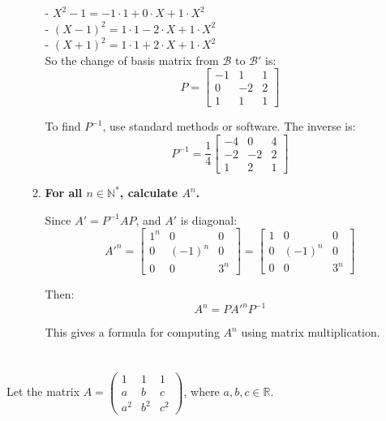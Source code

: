 \documentclass[12pt]{article}
\begin{document}
\begin{answerbox}
\begin{enumerate}
\begin{enumerate}
- $ X^2 - 1 = -1\cdot 1 + 0\cdot X + 1\cdot X^2 $ \\
- $ (X - 1)^2 = 1\cdot 1 - 2\cdot X + 1\cdot X^2 $ \\
- $ (X + 1)^2 = 1\cdot 1 + 2\cdot X + 1\cdot X^2 $ \\

So the change of basis matrix from $ \mathcal{B} $ to $ \mathcal{B}' $ is:
$$
P =
\begin{bmatrix}
-1 & 1 & 1 \\
0 & -2 & 2 \\
1 & 1 & 1
\end{bmatrix}
$$

To find $ P^{-1} $, use standard methods or software. The inverse is:
$$
P^{-1} =
\frac{1}{4}
\begin{bmatrix}
-4 & 0 & 4 \\
-2 & -2 & 2 \\
1 & 2 & 1
\end{bmatrix}
$$

\bigskip

\item \textbf{ For all $ n \in \mathbb{N}^* $, calculate $ A^n $.}

Since $ A' = P^{-1} A P $, and $ A' $ is diagonal:
$$
A'^n =
\begin{bmatrix}
1^n & 0 & 0 \\
0 & (-1)^n & 0 \\
0 & 0 & 3^n
\end{bmatrix}
=
\begin{bmatrix}
1 & 0 & 0 \\
0 & (-1)^n & 0 \\
0 & 0 & 3^n
\end{bmatrix}
$$

Then:
$$
A^n = P A'^n P^{-1}
$$

This gives a formula for computing $ A^n $ using matrix multiplication.

\end{enumerate}

\end{enumerate}
\end{answerbox}

\newpage

\section{}
Let the matrix $A = \begin{pmatrix} 1 & 1 & 1 \\ a & b & c \\ a^2 & b^2 & c^2 \end{pmatrix}$, where $a, b, c \in \mathbb{R}$.
\end{document}
